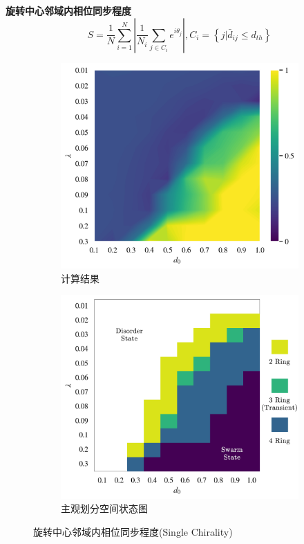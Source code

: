 \documentclass{article}
\begin{document}
\noindent\textbf{旋转中心邻域内相位同步程度}
$$
S=\frac{1}{N}\sum_{i=1}^N{\left| \frac{1}{N_i}\sum_{j\in C_i}{e^{i\theta _j}} \right|}, C_i=\left\{ j|\bar{d}_{ij}\le d_{th} \right\} 
$$
\vspace{-0.5cm}
\begin{figure}[H]
	\centering
	\begin{subfigure}[b]{0.49\textwidth}
		\includegraphics[width=\textwidth]{./figs/limitDisPhaseSyncRing.png}
		\vspace{-1cm}
		\caption{计算结果}
	\end{subfigure}
	\begin{subfigure}[b]{0.49\textwidth}
		\includegraphics[width=\textwidth]{./figs/subjectiveOpRing.png}
		\vspace{-1cm}
		\caption{主观划分空间状态图}
	\end{subfigure}
	\vspace{-0.5cm}
	\caption{旋转中心邻域内相位同步程度(Single Chirality)}
	\label{fig:fig234c.5.2}
\end{figure}
\end{document}
